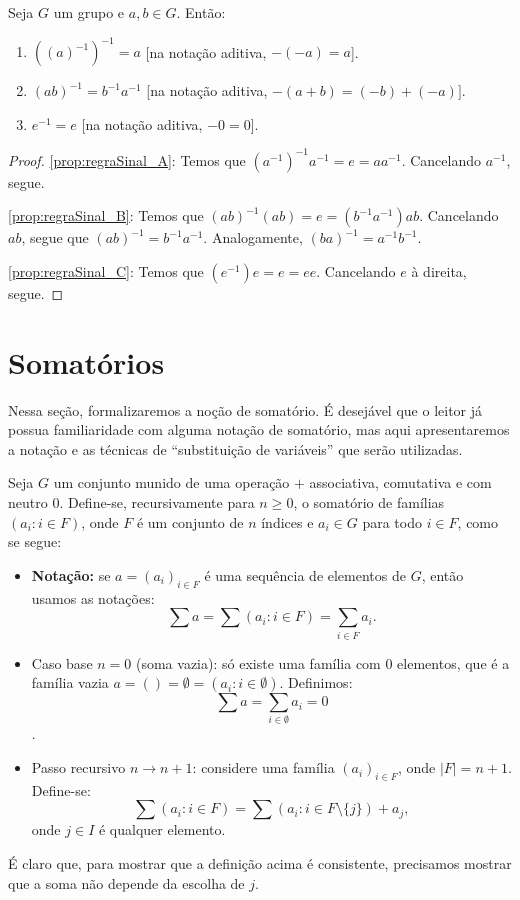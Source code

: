 \begin{prop}\label{prop:regraSinal}
    Seja $G$ um grupo e $a, b \in G$.
    Então:
    \begin{enumerate}[label=\alph*)]
        \item $((a)^{-1})^{-1}=a$ [na notação aditiva, $-(-a)=a$].
\label{prop:regraSinal_A}
        \item $(ab)^{-1}=b^{-1}a^{-1}$ [na notação aditiva, $-(a+b)=(-b)+(-a)]$.\label{prop:regraSinal_B}
        \item $e^{-1}=e$ [na notação aditiva, $-0=0$].\label{prop:regraSinal_C}
    \end{enumerate}
\end{prop}
\begin{proof}
    \ref{prop:regraSinal_A}: Temos que $(a^{-1})^{-1}a^{-1}=e=aa^{-1}$.
    Cancelando $a^{-1}$, segue.
    
    \ref{prop:regraSinal_B}: Temos que $(ab)^{-1}(ab)=e=(b^{-1}a^{-1})ab$.
    Cancelando $ab$, segue que $(ab)^{-1}=b^{-1}a^{-1}$.
    Analogamente, $(ba)^{-1}=a^{-1}b^{-1}$.

    \ref{prop:regraSinal_C}: Temos que $(e^{-1})e=e=ee$.
    Cancelando $e$ à direita, segue.


\end{proof}

\section{Somatórios}

Nessa seção, formalizaremos a noção de somatório.
É desejável que o leitor já possua familiaridade com alguma notação de somatório, mas aqui apresentaremos a notação e as técnicas de ``substituição de variáveis'' que serão utilizadas.

\begin{definition}
Seja $G$ um conjunto munido de uma operação $+$ associativa, comutativa e com neutro $0$.
Define-se, recursivamente para $n\geq 0$, o somatório de famílias $(a_i: i \in F)$, onde $F$ é um conjunto de $n$ índices e $a_i \in G$ para todo $i \in F$, como se segue:

\begin{itemize}
    \item \textbf{Notação:} se $a=(a_i)_{i\in F}$ é uma sequência de elementos de $G$, então usamos as notações:
    \[\sum a=\sum(a_i: i\in F)=\sum_{i\in F} a_i.\]
    \item Caso base $n=0$ (soma vazia): só existe uma família com $0$ elementos, que é a família vazia $a=()=\emptyset=(a_i:i\in \emptyset)$.
    Definimos: \[\sum a=\sum_{i \in \emptyset}a_i=0\].
    \item Passo recursivo $n\rightarrow n+1$: considere uma família $(a_i)_{i\in F}$, onde $|F|=n+1$.
    Define-se:
    \[\sum(a_i: i \in F)=\sum(a_i: i \in F\setminus\{j\})+a_j,\]
    onde $j \in I$ é qualquer elemento.
\end{itemize}
\end{definition}
É claro que, para mostrar que a definição acima é consistente, precisamos mostrar que a soma não depende da escolha de $j$.

